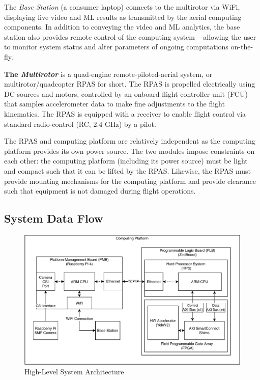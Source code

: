 The \textit{Base Station} (a consumer laptop) connects to the multirotor via WiFi, displaying live video and ML results as transmitted by the aerial computing components. In addition to conveying the video and ML analytics, the base station also provides remote control of the computing system -- allowing the user to monitor system status and alter parameters of ongoing computations on-the-fly.

\textbf{The \textit{Multirotor}} is a quad-engine remote-piloted-aerial system, or multirotor/quadcopter RPAS for short.
The RPAS is propelled electrically using DC sources and motors, controlled by an onboard flight controller unit (FCU) that samples accelerometer data to make fine adjustments to the flight kinematics.
The RPAS is equipped with a receiver to enable flight control via standard radio-control (RC, 2.4 GHz) by a pilot.

The RPAS and computing platform are relatively independent as the computing platform provides its own power source. The two modules impose constraints on each other: the computing platform (including its power source) must be light and compact such that it can be lifted by the RPAS. 
Likewise, the RPAS must provide mounting mechanisms for the computing platform and provide clearance such that equipment is not damaged during flight operations.

\subsection{System Data Flow}

\begin{figure}[H]
\centering
\includegraphics[width=15cm]{img/pc_diagram.pdf}
\caption{High-Level System Architecture}
\label{pcdiag}
\end{figure}

